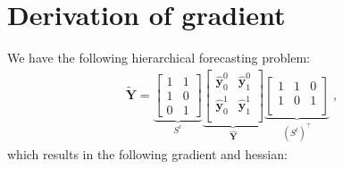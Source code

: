 \documentclass[preprint, 3p, times, twocolumn]{elsarticle}
\begin{document}
\section{Derivation of gradient} \label{app:hl_derivation}
We have the following hierarchical forecasting problem:
\begin{align*}
  \tilde{\textbf{Y}} = \underbrace{
    \begin{bmatrix}
    1 &1 \\
    1 &0 \\
    0 &1
    \end{bmatrix}}_{S^c}
    \underbrace{    
    \begin{bmatrix}
      \hat{\textbf{y}}^0_{0} & \hat{\textbf{y}}^0_{1} \\
      \hat{\textbf{y}}^1_{0} & \hat{\textbf{y}}^1_{1} \\
    \end{bmatrix}}_{\hat{\textbf{Y}}}
    \underbrace{
    \begin{bmatrix}
      1 &1 &0\\
      1 &0 &1\\
      \end{bmatrix}}_{(S^t)^\intercal}     
    \;,
\end{align*}
which results in the following gradient and hessian:
\end{document}
